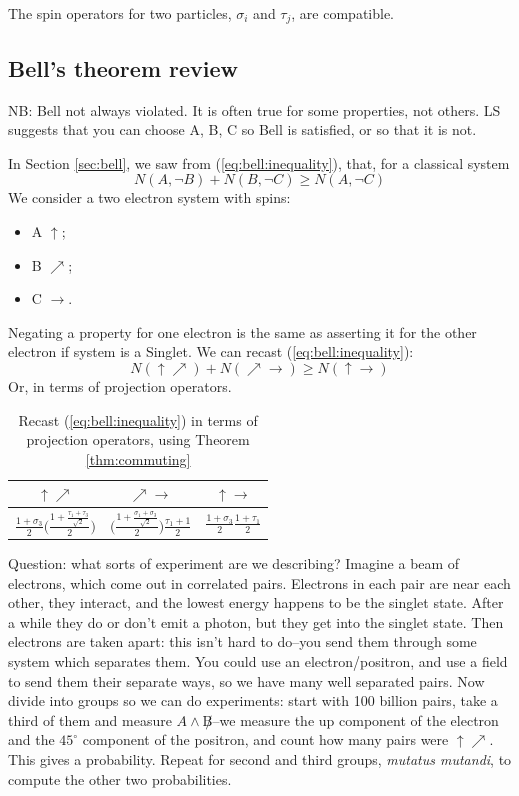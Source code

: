 \documentclass[]{article}
\begin{document}
The spin operators for two particles, $\sigma_i$ and $\tau_j$, are compatible.

\subsection{Bell's theorem review}\label{sec:bell:review}

NB: Bell not always violated. It is often true for some properties, not others. LS suggests that you can choose A, B, C so Bell is satisfied, or so that it is not.

In Section \ref{sec:bell}, we saw from (\ref{eq:bell:inequality}), that, for a classical system $$N(A, \neg B) + N(B, \neg C) \ge N(A,\neg C)$$
We consider a two electron system with spins:
\begin{itemize}
	\item A $\uparrow$;
	\item B $\nearrow$;
	\item C $\rightarrow$.
\end{itemize}
Negating a property for one electron is the same as asserting it for the other electron if system is a Singlet. We can recast (\ref{eq:bell:inequality}):
$$N(\uparrow \nearrow) + N(\nearrow \rightarrow) \ge N(\uparrow\rightarrow)$$
Or, in terms of projection operators.
\begin{table}[H]
	\begin{center}
		\caption{Recast (\ref{eq:bell:inequality}) in terms of projection operators, using Theorem \ref{thm:commuting}}
		\begin{tabular}{|c|c|c|} \hline
			$\uparrow\nearrow$&$\nearrow\rightarrow$&$\uparrow\rightarrow$ \\ \hline
			$\frac{1+\sigma_3}{2} \Big(\frac{1+\frac{\tau_1+\tau_3}{\sqrt{2}}}{2}\Big)$&$\Big(\frac{1+\frac{\sigma_1+\sigma_3}{\sqrt{2}}}{2}\Big)\frac{\tau_1+1}{2}$&$\frac{1+\sigma_3}{2} \frac{1+\tau_1}{2}$ \\ \hline
		\end{tabular}
	\end{center}
\end{table}

Question: what sorts of experiment are we describing? Imagine a beam of electrons, which come out in correlated pairs. Electrons in each pair are near each other, they interact, and the lowest energy happens to be the singlet state. After a while they do or don't emit a photon, but they get into the singlet state. Then electrons are taken apart: this isn't hard to do--you send them through some system which separates them. You could use an electron/positron, and use a field to send them their separate ways, so we have many well separated pairs. Now divide into groups so we can do experiments: start with 100 billion pairs, take a third of them and measure $A\land\not B$--we measure the up component of the electron and the $45^{\circ}$ component of the positron, and count how many pairs were $\uparrow\nearrow$. This gives a probability. Repeat for second and third groups, \emph{mutatus mutandi}, to compute the other two probabilities.
\end{document}
